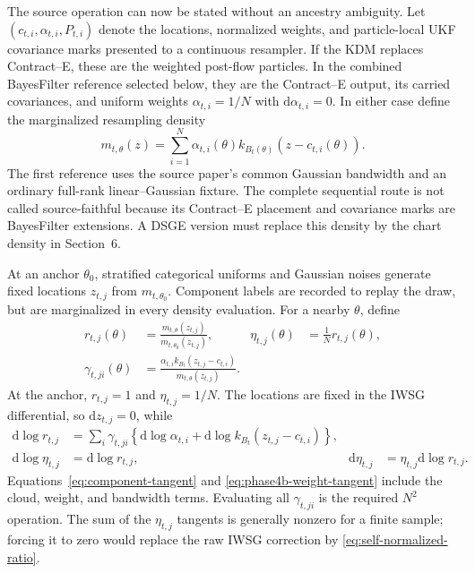 \documentclass[11pt]{article}
\newcommand{\dd}{\mathrm{d}}
\begin{document}
The source operation can now be stated without an ancestry ambiguity.  Let
$(c_{t,i},\alpha_{t,i},P_{t,i})$ denote the locations, normalized weights, and
particle-local UKF covariance marks presented to a continuous resampler.  If
the KDM replaces Contract--E, these are the weighted post-flow particles.  In
the combined BayesFilter reference selected below, they are the Contract--E
output, its carried covariances, and uniform weights
$\alpha_{t,i}=1/N$ with $\dd\alpha_{t,i}=0$.  In either case define the
marginalized resampling density
\begin{equation}
 m_{t,\theta}(z)=\sum_{i=1}^N
   \alpha_{t,i}(\theta)k_{B_t(\theta)}
      (z-c_{t,i}(\theta)).
 \label{eq:phase4b-mixture}
\end{equation}
The first reference uses the source paper's common Gaussian bandwidth and an
ordinary full-rank linear--Gaussian fixture.  The complete sequential route is
not called source-faithful because its Contract--E placement and covariance
marks are BayesFilter extensions.  A DSGE version must replace this density by
the chart density in Section~6.

At an anchor $\theta_0$, stratified categorical uniforms and Gaussian noises
generate fixed locations $z_{t,j}$ from $m_{t,\theta_0}$.  Component labels are
recorded to replay the draw, but are marginalized in every density evaluation.
For a nearby $\theta$, define
\begin{align}
 r_{t,j}(\theta)
   &=\frac{m_{t,\theta}(z_{t,j})}
           {m_{t,\theta_0}(z_{t,j})}, &
 \eta_{t,j}(\theta)
   &=\frac{1}{N}r_{t,j}(\theta),
 \label{eq:phase4b-iwsg-weights}\\
 \gamma_{t,ji}(\theta)
   &=\frac{\alpha_{t,i}k_{B_t}(z_{t,j}-c_{t,i})}
           {m_{t,\theta}(z_{t,j})}. &&
 \label{eq:phase4b-responsibilities}
\end{align}
At the anchor, $r_{t,j}=1$ and $\eta_{t,j}=1/N$.  The locations are fixed in the IWSG
differential, so $\dd z_{t,j}=0$, while
\begin{align}
 \dd\log r_{t,j}
   &=\sum_i\gamma_{t,ji}
      \left\{\dd\log\alpha_{t,i}
             +\dd\log k_{B_t}(z_{t,j}-c_{t,i})\right\},\\
 \dd\log\eta_{t,j}&=\dd\log r_{t,j}, &
 \dd\eta_{t,j}&=\eta_{t,j}\dd\log r_{t,j}.
 \label{eq:phase4b-weight-tangent}
\end{align}
Equations~\eqref{eq:component-tangent} and
\eqref{eq:phase4b-weight-tangent} include the cloud, weight, and bandwidth
terms.  Evaluating all $\gamma_{t,ji}$ is the required $N^2$ operation.  The
sum of the $\eta_{t,j}$ tangents is generally nonzero for a finite sample;
forcing it to zero would replace the raw IWSG correction by
\eqref{eq:self-normalized-ratio}.
\end{document}
